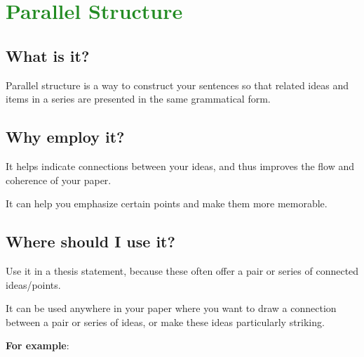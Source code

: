 \section{\textcolor{ForestGreen}{Parallel Structure}}

\subsection{What is it?}

Parallel structure is a way to construct your sentences so that related ideas and items in a series are presented in the same grammatical form.

\subsection{Why employ it?}

It helps indicate connections between your ideas, and thus improves the flow and coherence of your paper.

It can help you emphasize certain points and make them more memorable.

\subsection{Where should I use it?}

Use it in a thesis statement, because these often offer a pair or series of connected ideas/points.

It can be used anywhere in your paper where you want to draw a connection between a pair or series of ideas, or make these ideas particularly striking.

\textbf{For example}:

